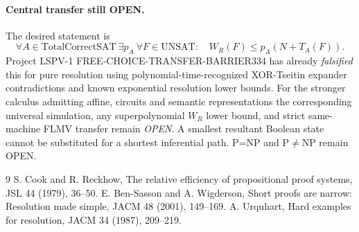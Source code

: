 \documentclass[11pt]{article}
\begin{document}
\paragraph{Central transfer still OPEN.} The desired statement is
\[
\forall A\in\mathrm{TotalCorrectSAT}\ \exists p_A\ \forall F\in\mathrm{UNSAT}:\quad W_R(F)\le p_A(N+T_A(F)).
\]
Project LSPV-1 FREE-CHOICE-TRANSFER-BARRIER334 has already \emph{falsified} this for pure resolution using polynomial-time-recognized XOR-Tseitin expander contradictions and known exponential resolution lower bounds. For the stronger calculus admitting affine, circuits and semantic representations the corresponding universal simulation, any superpolynomial \(W_R\) lower bound, and strict same-machine FLMV transfer remain \emph{OPEN}. A smallest resultant Boolean state cannot be substituted for a shortest inferential path. P=NP and P\(\ne\)NP remain OPEN.
\begin{thebibliography}{9}
 S. Cook and R. Reckhow, The relative efficiency of propositional proof systems, JSL 44 (1979), 36--50.
 E. Ben-Sasson and A. Wigderson, Short proofs are narrow: Resolution made simple, JACM 48 (2001), 149--169.
 A. Urquhart, Hard examples for resolution, JACM 34 (1987), 209--219.
\end{thebibliography}
\end{document}
